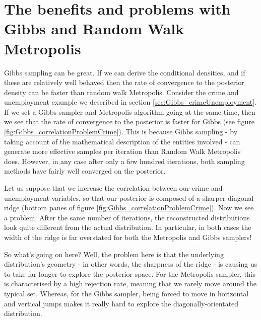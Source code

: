 \documentclass[11pt,fullpage]{book}
\begin{document}
\section{The benefits and problems with Gibbs and Random Walk Metropolis}
Gibbs sampling can be great. If we can derive the conditional densities, and if these are relatively well behaved then the rate of convergence to the posterior density can be faster than random walk Metropolis. Consider the crime and unemployment example we described in section \ref{sec:Gibbs_crimeUnemployment}. If we set a Gibbs sampler and Metropolis algorithm going at the same time, then we see that the rate of convergence to the posterior is faster for Gibbs (see figure \ref{fig:Gibbs_correlationProblemCrime}). This is because Gibbs sampling - by taking account of the mathematical description of the entities involved - can generate more effective samples per iteration than Random Walk Metropolis does. However, in any case after only a few hundred iterations, both sampling methods have fairly well converged on the posterior. 

Let us suppose that we increase the correlation between our crime and unemployment variables, so that our posterior is composed of a sharper diagonal ridge (bottom panes of figure \ref{fig:Gibbs_correlationProblemCrime}). Now we see a problem. After the same number of iterations, the reconstructed distributions look quite different from the actual distribution. In particular, in both cases the width of the ridge is far overstated for both the Metropolis and Gibbs samplers! 

So what's going on here? Well, the problem here is that the underlying distribution's geometry - in other words, the sharpness of the ridge - is causing us to take far longer to explore the posterior space. For the Metropolis sampler, this is characterised by a high rejection rate, meaning that we rarely move around the typical set. Whereas, for the Gibbs sampler, being forced to move in horizontal and vertical jumps makes it really hard to explore the diagonally-orientated distribution.
\end{document}
